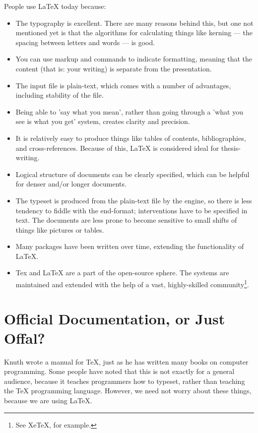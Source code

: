 \documentclass[11pt, oneside]{memoir}
\begin{document}
People use LaTeX today because:
\begin{itemize}
    \item The typography is excellent. There are many reasons behind this, but one not mentioned yet is that the algorithms for calculating things like kerning — the spacing between letters and words — is good.
    \item You can use markup and commands to indicate formatting, meaning that the content (that is: your writing) is separate from the presentation.
    \item The input file is plain-text, which comes with a number of advantages, including stability of the file. 
    \item Being able to 'say what you mean', rather than going through a 'what you see is what you get' system, creates clarity and precision.
    \item It is relatively easy to produce things like tables of contents, bibliographies, and cross-references. Because of this, LaTeX is considered ideal for thesis-writing.
    \item Logical structure of documents can be clearly specified, which can be helpful for denser and/or longer documents.
    \item The typeset is produced from the plain-text file by the engine, so there is less tendency to fiddle with the end-format; interventions have to be specified in text. The documents are less prone to become sensitive to small shifts of things like pictures or tables.
    \item Many packages have been written over time, extending the functionality of LaTeX.
    \item Tex and LaTeX are a part of the open-source sphere. The systems are maintained and extended with the help of a vast, highly-skilled community\footnote{See XeTeX, for example.}.
\end{itemize}

\section*{Official Documentation, or Just Offal?}

Knuth wrote a manual for TeX, just as he has written many books on computer programming. Some people have noted that this is not exactly for a general audience, because it teaches programmers how to typeset, rather than teaching the TeX programming language. However, we need not worry about these things, because we are using LaTeX.
\end{document}
